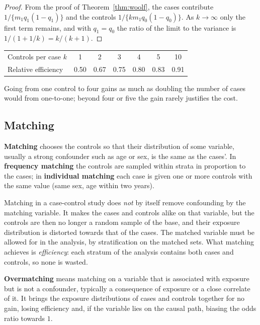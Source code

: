 \documentclass[11pt,a4paper]{article}
\numberwithin{equation}{section}
\theoremstyle{definition}
\begin{document}
\begin{proof}
From the proof of Theorem~\ref{thm:woolf}, the cases contribute $1/\{m_1 q_1(1 - q_1)\}$ and the controls $1/\{k m_1 q_0(1 - q_0)\}$. As $k \to \infty$ only the first term
remains, and with $q_1 = q_0$ the ratio of the limit to the variance is $1/(1 + 1/k) = k/(k + 1)$.
\end{proof}

\begin{center}
\begin{tabular}{lcccccc}
\hline
Controls per case $k$ & 1 & 2 & 3 & 4 & 5 & 10 \\
Relative efficiency & 0.50 & 0.67 & 0.75 & 0.80 & 0.83 & 0.91 \\
\hline
\end{tabular}
\end{center}
Going from one control to four gains as much as doubling the number of cases would from one-to-one; beyond four or five the gain
rarely justifies the cost.

\subsection{Matching}
\label{sec:matching}

\textbf{Matching} chooses the controls so that their distribution of some variable, usually a strong confounder such as age or sex, is the
same as the cases'. In \textbf{frequency matching} the controls are sampled within strata in proportion to the cases; in
\textbf{individual matching} each case is given one or more controls with the same value (same sex, age within two years).

Matching in a case-control study does \emph{not} by itself remove confounding by the matching variable. It makes the cases and controls
alike on that variable, but the controls are then no longer a random sample of the base, and their exposure distribution is distorted
towards that of the cases. The matched variable must be allowed for in the analysis, by stratification on the matched sets. What
matching achieves is \emph{efficiency}: each stratum of the analysis contains both cases and controls, so none is wasted.

\textbf{Overmatching} means matching on a variable that is associated with exposure but is not a confounder, typically a consequence of
exposure or a close correlate of it. It brings the exposure distributions of cases and controls together for no gain, losing
efficiency and, if the variable lies on the causal path, biasing the odds ratio towards $1$.
\end{document}
